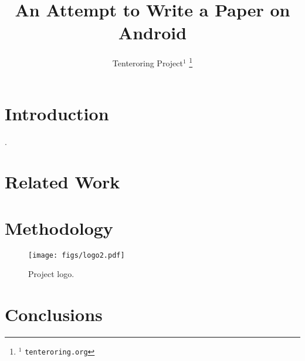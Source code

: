 \documentclass[letterpaper, 10 pt, conference]{ieeeconf}  %
\title{\LARGE \bf
An Attempt to Write a Paper on Android
}
\author{Tenteroring Project$^{1}$%
\thanks{$^{1}$ {\tt\small tenteroring.org}}%
}
\begin{document}
\maketitle
\thispagestyle{empty}
\pagestyle{empty}

\begin{abstract}

\lipsum[1]

\end{abstract}


\section{Introduction}

\cite{tenteroring}.

\lipsum[2]

\section{Related Work}

\lipsum[3]

\section{Methodology}

\begin{figure}[tb]
  \centering
  \texttt{[image: figs/logo2.pdf]}
  \caption{Project logo.}
\end{figure}

\lipsum[5-6]

\section{Conclusions}

\lipsum[7]




\end{document}

